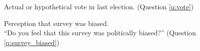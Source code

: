 \documentclass[12pt,english]{article}
\begin{document}



\begin{figure}[h!] 
    \caption[Actual or hypothetical vote in last election]{Actual or hypothetical vote in last election. (Question \ref{q:vote})}\label{fig:vote}
\end{figure}

\begin{figure}[h!] 
    \caption[Perception that survey was biased]{Perception that survey was biased. \\ ``Do you feel that this survey was politically biased?'' (Question \ref{q:survey_biased})}\label{fig:survey_biased}
\end{figure}

\end{document}
